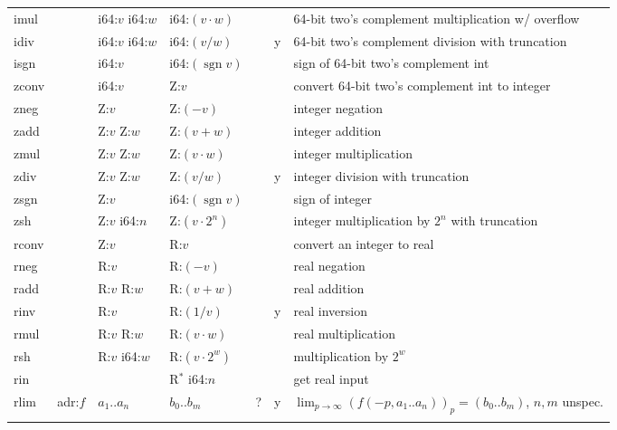 \documentclass[a4paper,parskip=half]{scrartcl}
\begin{document}
\begin{figure}[h]
\begin{tabular}{l|l|l|l@{\;\,\vline\,}c@{\,\vline\,}c@{\,\vline\;\,}l}
  \ttfamily imul  &         & i64:$v$ i64:$w$ & i64:$(v\cdot w)$ && & 64-bit two's complement multiplication w/ overflow \\
  \ttfamily idiv  &         & i64:$v$ i64:$w$ & i64:$(v/w)$      &&y& 64-bit two's complement division with truncation \\
  \ttfamily isgn  &         & i64:$v$         & i64:$(\operatorname{sgn}v)$ &&& sign of 64-bit two's complement int \\
  \hline
  \ttfamily zconv &         & i64:$v$         & Z:$v$            && & convert 64-bit two's complement int to integer \\
  \ttfamily zneg  &         & Z:$v$           & Z:$(-v)$         && & integer negation \\
  \ttfamily zadd  &         & Z:$v$ Z:$w$     & Z:$(v+w)$        && & integer addition \\
  \ttfamily zmul  &         & Z:$v$ Z:$w$     & Z:$(v\cdot w)$   && & integer multiplication \\
  \ttfamily zdiv  &         & Z:$v$ Z:$w$     & Z:$(v/w)$        &&y& integer division with truncation \\
  \ttfamily zsgn  &         & Z:$v$           & i64:$(\operatorname{sgn}v)$ &&& sign of integer \\
  \ttfamily zsh   &         & Z:$v$ i64:$n$   & Z:$(v\cdot2^n)$  && & integer multiplication by $2^n$ with truncation \\
  \hline
  \ttfamily rconv &         & Z:$v$           & R:$v$           & && convert an integer to real \\
  \ttfamily rneg  &         & R:$v$           & R:$(-v)$        & && real negation \\
  \ttfamily radd  &         & R:$v$ R:$w$     & R:$(v+w)$       & && real addition \\
  \ttfamily rinv  &         & R:$v$           & R:$(1/v)$       & &y& real inversion \\
  \ttfamily rmul  &         & R:$v$ R:$w$     & R:$(v\cdot w)$  & && real multiplication \\
  \ttfamily rsh   &         & R:$v$ i64:$w$   & R:$(v\cdot2^w)$ & && multiplication by $2^w$ \\
  \ttfamily rin   &         &                 & R$^*$ i64:$n$   & && get real input \\
  \hline
  \ttfamily rlim  & adr:$f$ & $a_1..a_n$ & $b_0..b_m$ &?&y& $\lim_{p\to\infty}{(f(-p,a_1..a_n))_p} = (b_0..b_m)$, $n,m$ unspec. \\[-1.35ex]\hline\noalign{\vspace{\dimexpr 1.35ex-.5pt}}

\end{tabular}
\end{figure}
\end{document}

